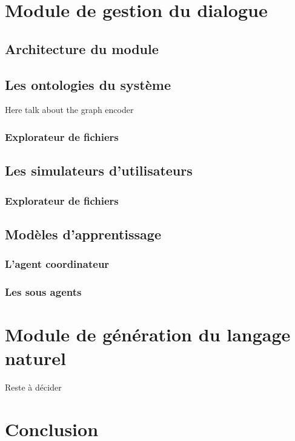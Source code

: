 \section{Module de gestion du dialogue}
	\subsection{Architecture du module}
	\subsection{Les ontologies du système}
		Here talk about the graph encoder 
		\subsubsection*{Explorateur de fichiers}
	\subsection{Les simulateurs d'utilisateurs}
		\subsubsection*{Explorateur de fichiers}
	\subsection{Modèles d'apprentissage}
		\subsubsection*{L'agent coordinateur}
		\subsubsection*{Les sous agents}

\section{Module de génération du langage naturel}
	Reste à décider
\section{Conclusion}	